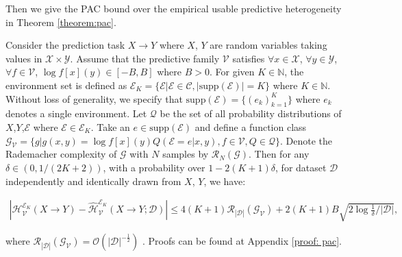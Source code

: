 Then we give the PAC bound over the empirical usable predictive heterogeneity in Theorem \ref{theorem:pac}.
\label{sec:bounds}
\begin{theorem}
\label{theorem:pac}
	Consider the prediction task $X \rightarrow Y$ where $X$, $Y$ are random variables taking values in $\mathcal X \times \mathcal Y$. Assume that the predictive family $\mathcal V$ satisfies $\forall x\in\mathcal{X}$, $\forall y \in \mathcal Y$,$\forall f \in \mathcal V$, $\log f[x](y) \in [-B,B]$ where $B > 0$.  
	For given $K \in \mathbb N$, the environment set is defined as $\mathscr E_K = \{ \mathcal E| \mathcal E \in \mathcal C, |\text{supp}(\mathcal E)| = K \}$ where $K \in \mathbb N$. 
	Without loss of generality, we specify that  $\text{supp}(\mathcal E) = \{ (e_k)_{k=1}^K \}$ where $e_k$ denotes a single environment.
	Let $\mathcal Q$ be the set of all probability distributions of $X$,$Y$,$\mathcal E$ where $\mathcal E \in \mathscr E_K$.  Take an $e \in \text{supp}(\mathcal E)$ and define a function class $\mathcal G_{\mathcal V} = \{g|g(x,y) = \log f[x](y)Q(\mathcal E=e|x,y), f\in \mathcal V, Q \in \mathcal Q  \}$. Denote the Rademacher complexity of $\mathcal{G}$ with $N$ samples by $\mathscr{R}_{N}(\mathcal{G})$.
Then for any $\delta \in \left(0,1/(2K+2)\right)$, with a probability over $1 - 2(K+1)\delta$, for dataset $\mathcal{D}$ independently and identically drawn from $X$, $Y$, we have:
\begin{small}
\begin{align}
    |\mathcal{H}^{\mathscr E_K}_{\mathcal V}(X\rightarrow Y) - \hat{\mathcal H}^{\mathscr E_K}_{\mathcal V}(X\rightarrow Y;\mathcal D)| \leq 4(K+1)\mathscr R_{|\mathcal D|}(\mathcal G_{\mathcal V}) + 2(K+1)B\sqrt{2\log{\frac{1}{\delta}}/|\mathcal D|},
\end{align}
\end{small}
where $\mathscr R_{|\mathcal D|}(\mathcal G_{\mathcal V}) = \mathcal O(|\mathcal{D}|^{-\frac{1}{2}})$ \citep{bartlett2002rademacher}.
Proofs can be found at Appendix \ref{proof: pac}.
\end{theorem}









